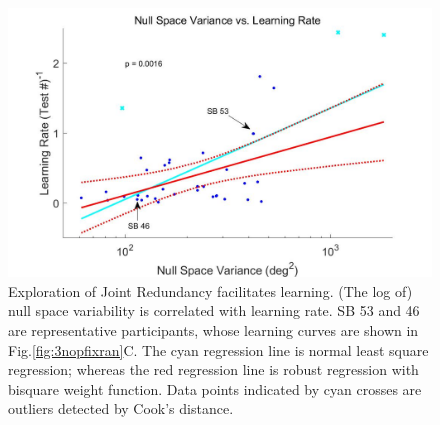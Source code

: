 \begin{figure}
	\centering
	\includegraphics[width=1\linewidth]{figures/5learnRateVSnullVar}
	\caption[Exploration of Joint Redundancy facilitates learning]
	{Exploration of Joint Redundancy facilitates learning. 
		(The log of) null space variability is correlated with learning rate.
		SB 53 and 46 are representative participants, whose learning curves are shown in Fig.\ref{fig:3nopfixran}C.
		The cyan regression line is normal least square regression; whereas the red regression line is robust regression with bisquare weight function. 
		Data points indicated by cyan crosses are outliers detected by Cook's distance.}
	\label{fig:5learnratevsnullvar}
\end{figure}

